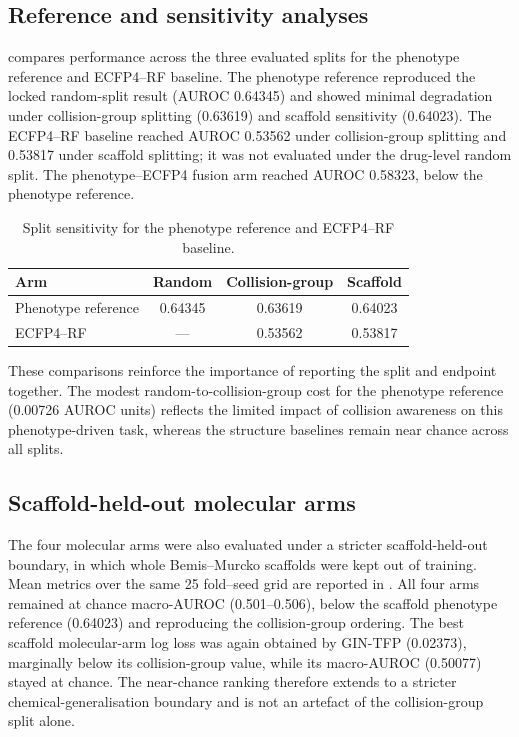 \documentclass[11pt,a4paper]{article}
\begin{document}
\subsection{Reference and sensitivity analyses}

 compares performance across the three evaluated splits for the phenotype reference and ECFP4--RF baseline. The phenotype reference reproduced the locked random-split result (AUROC \num{0.64345}) and showed minimal degradation under collision-group splitting (\num{0.63619}) and scaffold sensitivity (\num{0.64023}). The ECFP4--RF baseline reached AUROC \num{0.53562} under collision-group splitting and \num{0.53817} under scaffold splitting; it was not evaluated under the drug-level random split. The phenotype--ECFP4 fusion arm reached AUROC \num{0.58323}, below the phenotype reference.

\begin{table}[htbp]
\centering
\caption{Split sensitivity for the phenotype reference and ECFP4--RF baseline.}
\label{tab:p6_splits}
\begin{tabular}{lccc}
\toprule
Arm & Random & Collision-group & Scaffold \\
\midrule
Phenotype reference & \num{0.64345} & \num{0.63619} & \num{0.64023}\\
ECFP4--RF & --- & \num{0.53562} & \num{0.53817}\\
\bottomrule
\end{tabular}
\end{table}

These comparisons reinforce the importance of reporting the split and endpoint together. The modest random-to-collision-group cost for the phenotype reference (\num{0.00726} AUROC units) reflects the limited impact of collision awareness on this phenotype-driven task, whereas the structure baselines remain near chance across all splits.

\subsection{Scaffold-held-out molecular arms}

The four molecular arms were also evaluated under a stricter scaffold-held-out boundary, in which whole Bemis--Murcko scaffolds were kept out of training. Mean metrics over the same \num{25} fold--seed grid are reported in . All four arms remained at chance macro-AUROC (\num{0.501}--\num{0.506}), below the scaffold phenotype reference (\num{0.64023}) and reproducing the collision-group ordering. The best scaffold molecular-arm log loss was again obtained by GIN-TFP (\num{0.02373}), marginally below its collision-group value, while its macro-AUROC (\num{0.50077}) stayed at chance. The near-chance ranking therefore extends to a stricter chemical-generalisation boundary and is not an artefact of the collision-group split alone.
\end{document}
